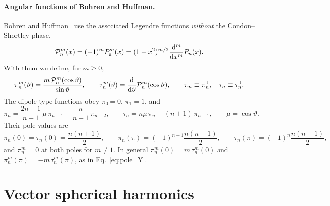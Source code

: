 \documentclass[
    pra,
    aps,
    reprint,
    onecolumn,
    amsmath,amssymb,
    a4paper,
    superscriptaddress,
    10pt,
    nofootinbib
]{revtex4-2}
\begin{document}
\paragraph{Angular functions of Bohren and Huffman.}
Bohren and Huffman~\cite{Bohren1984} use the associated Legendre functions \emph{without} the Condon--Shortley phase,
\begin{equation}
    \mathcal{P}_n^m(x) = (-1)^m P_n^m(x) = (1-x^2)^{m/2} \dv[m]{x} P_n(x) .
    \label{eq:P_BH}
\end{equation}
With them we define, for $m \geq 0$,
\begin{equation}
    \pi_n^m(\vartheta) = \frac{m\, \mathcal{P}_n^m(\cos\vartheta)}{\sin\vartheta}, \qquad
    \tau_n^m(\vartheta) = \dv{\vartheta}\mathcal{P}_n^m(\cos\vartheta), \qquad
    \pi_n \equiv \pi_n^1, \quad \tau_n \equiv \tau_n^1 .
    \label{eq:pitau}
\end{equation}
The dipole-type functions obey $\pi_0 = 0$, $\pi_1 = 1$, and
\begin{equation}
    \pi_n = \frac{2n-1}{n-1}\, \mu\, \pi_{n-1} - \frac{n}{n-1}\, \pi_{n-2}, \qquad
    \tau_n = n \mu\, \pi_n - (n+1)\, \pi_{n-1}, \qquad \mu = \cos\vartheta .
    \label{eq:pitau_rec}
\end{equation}
Their pole values are
\begin{equation}
    \pi_n(0) = \tau_n(0) = \frac{n(n+1)}{2}, \qquad
    \pi_n(\pi) = (-1)^{n+1}\frac{n(n+1)}{2}, \qquad
    \tau_n(\pi) = (-1)^{n}\frac{n(n+1)}{2},
    \label{eq:pitau_pole}
\end{equation}
and $\pi_n^m = 0$ at both poles for $m \neq 1$.
In general $\pi^m_n(0) = m\,\tau^m_n(0)$ and $\pi^m_n(\pi) = -m\,\tau^m_n(\pi)$, as in Eq.~\eqref{eq:pole_Y}.

\section{Vector spherical harmonics}
\label{sec:vsh}
\end{document}
